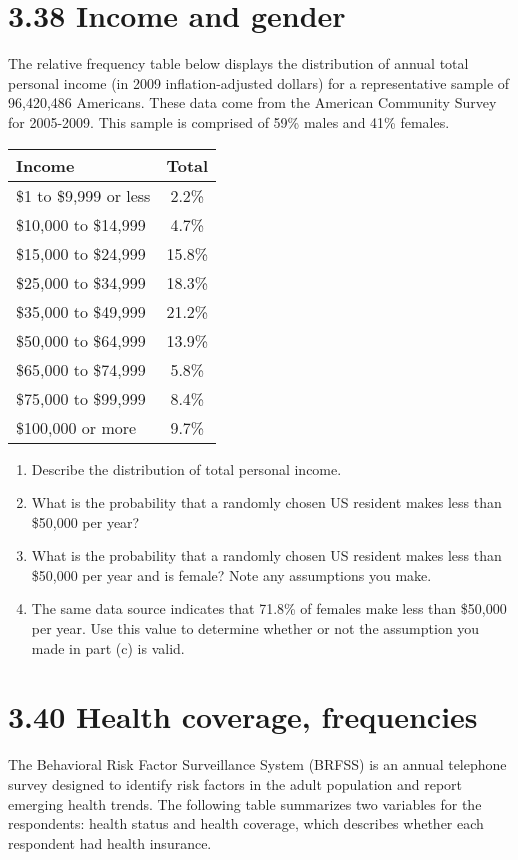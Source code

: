 \documentclass{article}
\begin{document}
\section*{3.38 Income and gender}
The relative frequency table below displays the distribution of annual total personal income (in 2009 inflation-adjusted dollars) for a representative sample of 96,420,486 Americans. These data come from the American Community Survey for 2005-2009. This sample is comprised of 59\% males and 41\% females.

\begin{table}[H]
\centering
\settowidth{}
\setlength\extrarowheight{2pt}
\begin{tabulary}{\linewidth}{|l|c|}
\hline
\textbf{Income} & \textbf{Total} \\
\hline
\$1 to \$9,999 or less & 2.2\% \\
\$10,000 to \$14,999 & 4.7\% \\
\$15,000 to \$24,999 & 15.8\% \\
\$25,000 to \$34,999 & 18.3\% \\
\$35,000 to \$49,999 & 21.2\% \\
\$50,000 to \$64,999 & 13.9\% \\
\$65,000 to \$74,999 & 5.8\% \\
\$75,000 to \$99,999 & 8.4\% \\
\$100,000 or more & 9.7\% \\
\hline
\end{tabulary}
\end{table}

\begin{enumerate}
    \item[(a)] Describe the distribution of total personal income.
    \item[(b)] What is the probability that a randomly chosen US resident makes less than \$50,000 per year?
    \item[(c)] What is the probability that a randomly chosen US resident makes less than \$50,000 per year and is female? Note any assumptions you make.
    \item[(d)] The same data source indicates that 71.8\% of females make less than \$50,000 per year. Use this value to determine whether or not the assumption you made in part (c) is valid.
\end{enumerate}

\section*{3.40 Health coverage, frequencies}
The Behavioral Risk Factor Surveillance System (BRFSS) is an annual telephone survey designed to identify risk factors in the adult population and report emerging health trends. The following table summarizes two variables for the respondents: health status and health coverage, which describes whether each respondent had health insurance.
\end{document}
